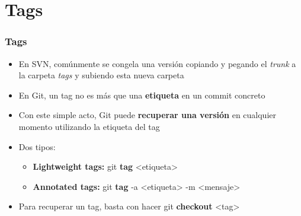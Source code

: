 \section{Tags}
\frame
{
\frametitle{Tags}
\begin{itemize}
 \item En SVN, comúnmente se congela una versión copiando y pegando el \textit{trunk} a la carpeta \textit{tags} y subiendo esta nueva carpeta
 \item En Git, un tag no es más que una \textbf{etiqueta} en un commit concreto
 \item Con este simple acto, Git puede \textbf{recuperar una versión} en cualquier momento utilizando la etiqueta del tag
 \item Dos tipos:
 \begin{itemize}
  \item \textbf{Lightweight tags:} git \textbf{tag} <etiqueta>
  \item \textbf{Annotated tags:} git \textbf{tag} -a <etiqueta> -m <mensaje>
 \end{itemize}
 \item Para recuperar un tag, basta con hacer git \textbf{checkout} <tag>

\end{itemize}
}
